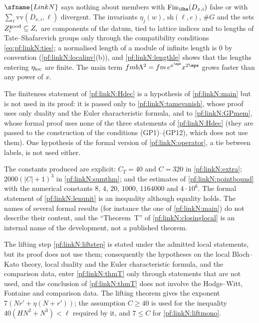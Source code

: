 \begin{remark}\label{pf:linkN:remcond}
$\sfname{LinkN}$ says nothing about members with $\linkNfin(D_{x,i})$ false or with $\sum_\ell\mathrm{vv}(D_{x,i},\ell)$ divergent. The
invariants $\eta_j(w)$, $\mathrm{sh}(\ell,e)$, $\#G$ and the sets $Z^{\mathrm{good}}_\iota\subseteq Z_\iota$ are components of the datum, tied to
lattice indices and to lengths of Tate--Shafarevich groups only through the compatibility conditions \eqref{eq:pf:linkN:ties}; a
normalised length of a module of infinite length is $0$ by convention (\cref{pf:linkN:localinv}(b)), and \cref{pf:linkN:lengthle}
shows that the lengths entering $\eta_{\mathrm{loc}}$ are finite. The main term $fmb\Lambda^2=fm\,e^{x^\eps}x^{2\eps}$ grows faster than any
power of $x$.
\end{remark}

\begin{remark}\label{pf:linkN:remunused}
The finiteness statement of \cref{pf:linkN:Hdec} is a hypothesis of \cref{pf:linkN:main} but is not used in its proof: it is passed
only to \cref{pf:linkN:tamevanish}, whose proof uses only duality and the Euler characteristic formula, and to \cref{pf:linkN:GPmem},
whose formal proof uses none of the three statements of \cref{pf:linkN:Hdec} (they are passed to the construction of the conditions
(GP1)--(GP12), which does not use them). One hypothesis of the formal version of \cref{pf:linkN:operator}, a tie between labels, is
not used either.
\end{remark}

\begin{remark}\label{pf:linkN:remconst}
The constants produced are explicit: $C_T=40$ and $C=320$ in \cref{pf:linkN:extra}; $2000(|C|+1)^3$ in \cref{pf:linkN:sumthm}; and the
estimates of \cref{pf:linkN:pointbound} with the numerical constants $8$, $4$, $20$, $1000$, $1164000$ and $4\cdot10^6$. The formal
statement of \cref{pf:linkN:lenunit} is an inequality although equality holds. The names of several formal results (for instance
the one of \cref{pf:linkN:main}) do not describe their content, and the ``Theorem~T'' of \cref{pf:linkN:closinglocal} is an internal
name of the development, not a published theorem.
\end{remark}

\begin{remark}\label{pf:linkN:remthmT}
The lifting step \cref{pf:linkN:liftstep} is stated under the admitted local statements, but its proof does not use them; consequently
the hypotheses on the local Bloch--Kato theory, local duality and the Euler characteristic formula, and the comparison data, enter
\cref{pf:linkN:thmT} only through statements that are not used, and the conclusion of \cref{pf:linkN:thmT} does not involve the Hodge--Witt,
Fontaine and comparison data. The lifting theorem gives the exponent $7(Nr'+\eta(N+r'))$; the assumption $C\ge40$ is used for the
inequality $40(HN^2+N^3)<\ell$ required by it, and $7\le C$ for \cref{pf:linkN:liftmono}.
\end{remark}

